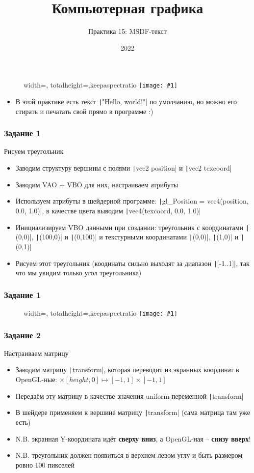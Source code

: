 \documentclass{beamer}
\title{Компьютерная графика}
\subtitle{Практика 15: MSDF-текст}
\date{2022}
\newcommand{\slideimage}[1]{
  \begin{figure}
    \begin{adjustbox}{width=\textwidth, totalheight=\textheight-2\baselineskip-2\baselineskip,keepaspectratio}
      \texttt{[image: \#1]}
    \end{adjustbox}
  \end{figure}
}
\begin{document}
\frame{\titlepage}

\begin{frame}
\slideimage{0.png}
\end{frame}

\begin{frame}[fragile]
\begin{itemize}
\item В этой практике есть текст \texttt|"Hello, world!"| по умолчанию, но можно его стирать и печатать свой прямо в программе :)
\end{itemize}
\end{frame}

\begin{frame}[fragile]
\frametitle{Задание 1}
Рисуем треугольник
\begin{itemize}
\item Заводим структуру вершины с полями \texttt|vec2 position| и \texttt|vec2 texcoord|
\item Заводим VAO + VBO для них, настраиваем атрибуты
\item Используем атрибуты в шейдерной программе: \texttt|gl_Position = vec4(position, 0.0, 1.0)|, в качестве цвета выводим \texttt|vec4(texcoord, 0.0, 1.0)|
\item Инициализируем VBO данными при создании: треугольник с координатами \texttt|(0,0)|, \texttt|(100,0)| и \texttt|(0,100)| и текстурными координатами \texttt|(0,0)|, \texttt|(1,0)| и \texttt|(0,1)|
\item Рисуем этот треугольник (коодинаты сильно выходят за диапазон \texttt|[-1..1]|, так что мы увидим только угол треугольника)
\end{itemize}
\end{frame}

\begin{frame}
\frametitle{Задание 1}
\slideimage{1.png}
\end{frame}

\begin{frame}[fragile]
\frametitle{Задание 2}
Настраиваем матрицу
\begin{itemize}
\item Заводим матрицу \texttt|transform|, которая переводит из экранных координат в OpenGL-ные: \begin{math}[0, width] \times [height, 0] \mapsto [-1, 1]\times[-1,1]\end{math}
\item Передаём эту матрицу в качестве значения uniform-переменной \texttt|transform|
\item В шейдере применяем к вершине матрицу \texttt|transform| (сама матрица там уже есть)
\item N.B. экранная Y-координата идёт \textbf{сверху вниз}, а OpenGL-ная -- \textbf{снизу вверх}!
\item N.B. треугольник должен появиться в верхнем левом углу и быть размером ровно 100 пикселей
\end{itemize}
\end{frame}
\end{document}
